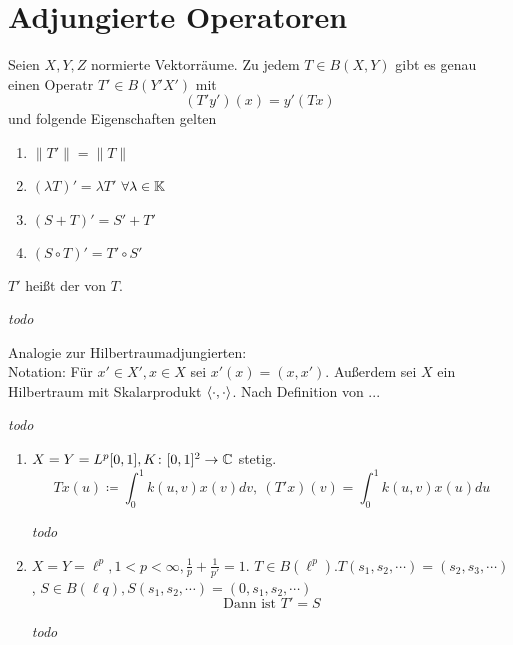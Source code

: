 

\section{Adjungierte Operatoren}


\begin{satz}
	Seien $X, Y, Z$ normierte Vektorräume. Zu jedem $T \in B(X, Y)$ gibt es genau einen Operatr $T' \in B(Y' X')$ mit 
	\[ (T' y')(x) = y'(T x) \]
	und folgende Eigenschaften gelten
	\begin{enumerate}[label=(\roman*\upshape)]
		\item $\| T' \| = \| T \|$
		\item $( \lambda T )' = \lambda T'$ $\forall \lambda \in \mathbb{K}$
		\item $(S + T)' = S' + T'$
		\item $(S \circ T)' = T' \circ S'$
	\end{enumerate}	
	$T'$ hei{\ss}t der  von $T$.
\end{satz}

\begin{beweis}
	\textit{todo} %
\end{beweis}


\begin{bemerkung}
	Analogie zur Hilbertraumadjungierten: \\
	Notation: Für $x' \in X', x \in X$ sei $x'(x) = (x, x')$. Außerdem sei $X$ ein Hilbertraum mit Skalarprodukt $\langle \cdot , \cdot \rangle$.  Nach Definition von ... %
\end{bemerkung}

\begin{beweis}
	\textit{todo} %
\end{beweis}


\begin{beispiel}
	\begin{enumerate}[label=\alph*\upshape)]
		\item $X = Y = L^{p}[0, 1], K \colon [0, 1]^{2} \rightarrow \mathbb{C}$ stetig.
			\[ T x(u) \coloneqq \int_{0}^{1} k(u, v) x(v) dv, ~ \left( T' x \right)(v) = \int_{0}^{1} k(u, v) x(u) du \]
		  \begin{beweis}
		  	\textit{todo} %
		  \end{beweis}
		\item $X =Y = \ell^{p}, 1 < p < \infty, \frac{1}{p} + \frac{1}{p'} = 1$. $T \in B(\ell^{p}). T(s_{1}, s_{2}, \cdots) = (s_{2}, s_{3}, \cdots)$, $S \in B(\ell{q}), S(s_{1}, s_{2}, \cdots) = (0, s_{1}, s_{2}, \cdots)$
			\[ \text{Dann ist } T' = S \]
		  \begin{beweis}
		  	\textit{todo} %
		  \end{beweis}
	\end{enumerate}
\end{beispiel}

